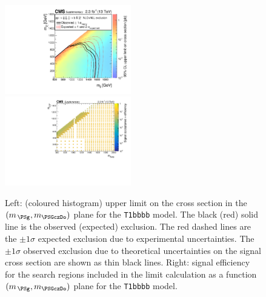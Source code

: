 \clearpage
\begin{figure}[t]
  \begin{center}
    \includegraphics[width=0.49\textwidth]{RA1T1bbbbXSEC_aux} \, 
    \includegraphics[width=0.49\textwidth]{T1bbbb_merging_4_cats_aux} \,     
  \end{center}
  \caption{Left: (coloured histogram) upper limit on the cross section in the $(m_{\,\PSg}, m_{\PSGczDo})$ plane for the \texttt{T1bbbb} model. 
  The black (red) solid line is the observed (expected) exclusion. The red dashed lines are the $\pm1\sigma$ expected exclusion due to experimental uncertainties. 
  The $\pm1\sigma$ observed exclusion due to theoretical uncertainties on the signal cross section are shown as thin black lines. 
  Right: signal efficiency for the search regions included in the limit calculation as a function $(m_{\,\PSg}, m_{\PSGczDo})$ plane for the \texttt{T1bbbb} model. 
  \label{fig:T1bbbb_excl}}
\end{figure}

